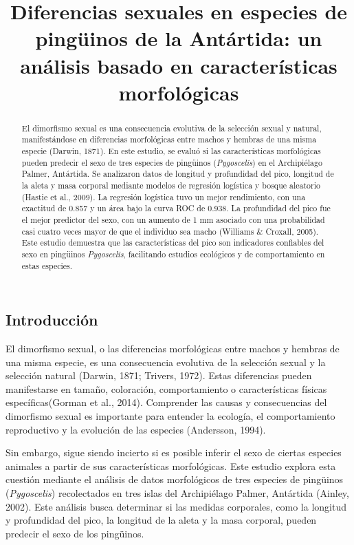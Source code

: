 \documentclass[
]{agujournal2019}
\begin{document}
\title{Diferencias sexuales en especies de pingüinos de la Antártida: un
análisis basado en características morfológicas}



\begin{abstract}
El dimorfismo sexual es una consecuencia evolutiva de la selección
sexual y natural, manifestándose en diferencias morfológicas entre
machos y hembras de una misma especie (Darwin, 1871). En este estudio,
se evaluó si las características morfológicas pueden predecir el sexo de
tres especies de pingüinos (\emph{Pygoscelis}) en el Archipiélago
Palmer, Antártida. Se analizaron datos de longitud y profundidad del
pico, longitud de la aleta y masa corporal mediante modelos de regresión
logística y bosque aleatorio (Hastie et al., 2009). La regresión
logística tuvo un mejor rendimiento, con una exactitud de 0.857 y un
área bajo la curva ROC de 0.938. La profundidad del pico fue el mejor
predictor del sexo, con un aumento de 1 mm asociado con una probabilidad
casi cuatro veces mayor de que el individuo sea macho (Williams \&
Croxall, 2005). Este estudio demuestra que las características del pico
son indicadores confiables del sexo en pingüinos \emph{Pygoscelis},
facilitando estudios ecológicos y de comportamiento en estas especies.
\end{abstract}





\subsection{Introducción}\label{introducciuxf3n}

El dimorfismo sexual, o las diferencias morfológicas entre machos y
hembras de una misma especie, es una consecuencia evolutiva de la
selección sexual y la selección natural (Darwin, 1871; Trivers, 1972).
Estas diferencias pueden manifestarse en tamaño, coloración,
comportamiento o características físicas específicas(Gorman et al.,
2014). Comprender las causas y consecuencias del dimorfismo sexual es
importante para entender la ecología, el comportamiento reproductivo y
la evolución de las especies (Andersson, 1994).

Sin embargo, sigue siendo incierto si es posible inferir el sexo de
ciertas especies animales a partir de sus características morfológicas.
Este estudio explora esta cuestión mediante el análisis de datos
morfológicos de tres especies de pingüinos (\emph{Pygoscelis})
recolectados en tres islas del Archipiélago Palmer, Antártida (Ainley,
2002). Este análisis busca determinar si las medidas corporales, como la
longitud y profundidad del pico, la longitud de la aleta y la masa
corporal, pueden predecir el sexo de los pingüinos.
\end{document}
